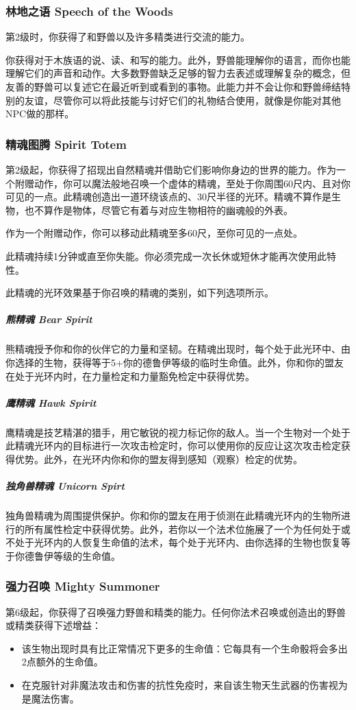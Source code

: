 \subsubsection{林地之语 Speech of the Woods}
第2级时，你获得了和野兽以及许多精类进行交流的能力。

你获得对于木族语的说、读、和写的能力。此外，野兽能理解你的语言，而你也能理解它们的声音和动作。大多数野兽缺乏足够的智力去表述或理解复杂的概念，但友善的野兽可以复述它在最近听到或看到的事物。此能力并不会让你和野兽缔结特别的友谊，尽管你可以将此技能与讨好它们的礼物结合使用，就像是你能对其他NPC做的那样。


\subsubsection{精魂图腾 Spirit Totem}
第2级起，你获得了招现出自然精魂并借助它们影响你身边的世界的能力。作为一个附赠动作，你可以魔法般地召唤一个虚体的精魂，至处于你周围60尺内、且对你可见的一点。此精魂创造出一道环绕该点的、30尺半径的光环。精魂不算作是生物，也不算作是物体，尽管它有着与对应生物相符的幽魂般的外表。

作为一个附赠动作，你可以移动此精魂至多60尺，至你可见的一点处。

此精魂持续1分钟或直至你失能。你必须完成一次长休或短休才能再次使用此特性。

此精魂的光环效果基于你召唤的精魂的类别，如下列选项所示。

\subparagraph{熊精魂 Bear Spirit}熊精魂授予你和你的伙伴它的力量和坚韧。在精魂出现时，每个处于此光环中、由你选择的生物，获得等于5+你的德鲁伊等级的临时生命值。此外，你和你的盟友在处于光环内时，在力量检定和力量豁免检定中获得优势。

\subparagraph{鹰精魂 Hawk Spirit}鹰精魂是技艺精湛的猎手，用它敏锐的视力标记你的敌人。当一个生物对一个处于此精魂光环内的目标进行一次攻击检定时，你可以使用你的反应让这次攻击检定获得优势。此外，在光环内你和你的盟友得到感知（观察）检定的优势。

\subparagraph{独角兽精魂 Unicorn Spirt}独角兽精魂为周围提供保护。你和你的盟友在用于侦测在此精魂光环内的生物所进行的所有属性检定中获得优势。此外，若你以一个法术位施展了一个为任何处于或不处于光环内的人恢复生命值的法术，每个处于光环内、由你选择的生物也恢复等于你德鲁伊等级的生命值。

\subsubsection{强力召唤 Mighty Summoner}
第6级起，你获得了召唤强力野兽和精类的能力。任何你法术召唤或创造出的野兽或精类获得下述增益：
\begin{itemize}
\item 该生物出现时具有比正常情况下更多的生命值：它每具有一个生命骰将会多出2点额外的生命值。
\item 在克服针对非魔法攻击和伤害的抗性免疫时，来自该生物天生武器的伤害视为是魔法伤害。
\end{itemize}

